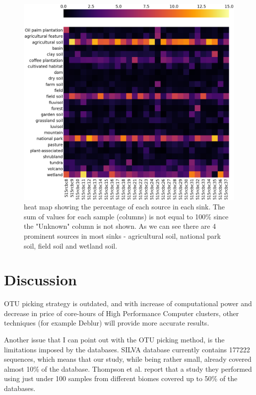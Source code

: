 \documentclass[12pt,twocolumn]{article}
\begin{document}
\begin{figure}[ht!] %
	\includegraphics[width=\linewidth]{heatmap_perc.png}
	\caption{heat map showing the percentage of each source in each sink. The sum of values for each sample (columns) is not equal to 100\% since the "Unknown" column is not shown. As we can see there are 4 prominent sources in most sinks - agricultural soil, national park soil, field soil and wetland soil.}
	\label{fig:sourcetracker_heatmap}
\end{figure}


\par





%
%

\section{Discussion}
OTU picking strategy is outdated, and with increase of computational power and decrease in price of core-hours of High Performance Computer clusters, other techniques (for example Deblur\cite{Amir}) will provide more accurate results.
\par

Another issue that I can point out with the OTU picking method, is the limitations imposed by the databases. SILVA database currently contains 177222 sequences, which means that our study, while being rather small, already covered almost 10\% of the database. Thompson et al.\cite{Thompson2017} report that a study they performed using just under 100 samples from different biomes covered up to 50\% of the databases.
\par
\end{document}
